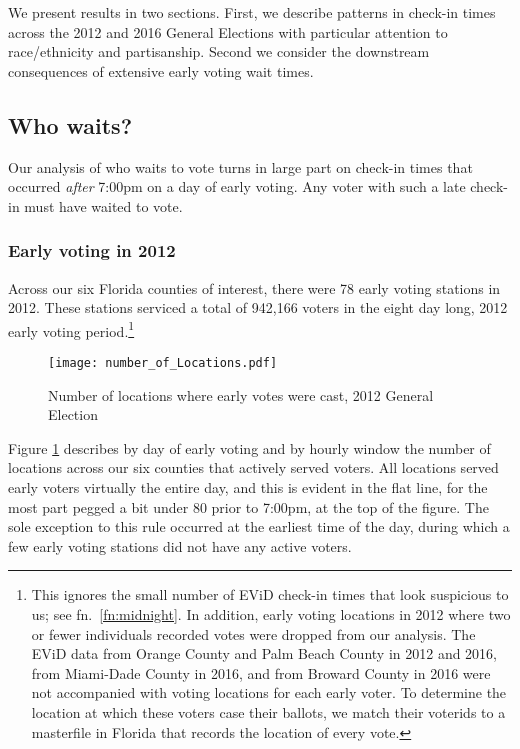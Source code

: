 \documentclass[12pt,titlepage]{article}
\begin{document}
We present results in two sections.  First, we describe patterns in
check-in times across the 2012 and 2016 General Elections with
particular attention to race/ethnicity and partisanship.  Second we
consider the downstream consequences of extensive early voting wait
times.


\subsection*{Who waits?}

Our analysis of who waits to vote turns in large part on check-in
times that occurred \emph{after} 7:00pm on a day of early voting.  Any
voter with such a late check-in must have waited to vote.

\subsubsection*{Early voting in 2012}

Across our six Florida counties of interest, there were 78 early
voting stations in 2012.  These stations serviced a total of 942,166
voters in the eight day long, 2012 early voting period.\footnote{This
  ignores the small number of EViD check-in times that look suspicious
  to us; see fn.\ \ref{fn:midnight}.  In addition, early voting
  locations in 2012 where two or fewer individuals recorded votes were
  dropped from our analysis.  The EViD data from Orange County and
  Palm Beach County in 2012 and 2016, from Miami-Dade County in 2016,
  and from Broward County in 2016 were not accompanied with voting
  locations for each early voter.  To determine the location at which
  these voters case their ballots, we match their voterids to a
  masterfile in Florida that records the location of every
  vote.}  %



\begin{figure}[!ht]
  \caption{Number of locations where early votes were cast, 2012 General Election}
  \label{fig:nrlocs2012}
  \centering
    \centering\texttt{[image: number\_of\_Locations.pdf]}
\end{figure}

Figure \ref{fig:nrlocs2012} describes by day of early voting and by
hourly window the number of locations across our six counties that
actively served voters.  All locations served early voters virtually
the entire day, and this is evident in the flat line, for the most
part pegged a bit under 80 prior to 7:00pm, at the top of the figure.
The sole exception to this rule occurred at the earliest time of the
day, during which a few early voting stations did not have any active
voters.
\end{document}
